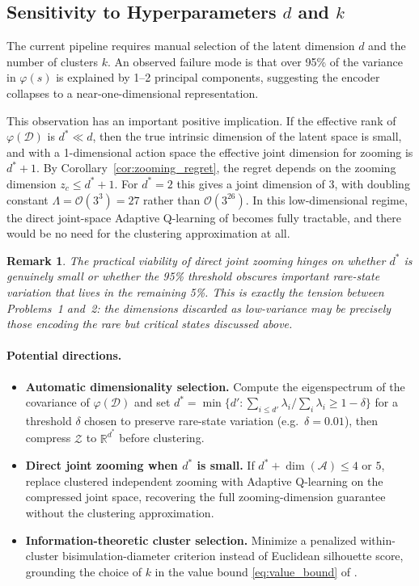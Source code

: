 \documentclass{article}
\newtheorem{remark}[theorem]{Remark}
\begin{document}
\subsection{Sensitivity to Hyperparameters $d$ and $k$}

The current pipeline requires manual selection of the latent dimension $d$ and the
number of clusters $k$. An observed failure mode is that over 95\% of the variance in
$\varphi(s)$ is explained by 1--2 principal components, suggesting the encoder
collapses to a near-one-dimensional representation.

This observation has an important positive implication. If the effective rank of
$\varphi(\mathcal{D})$ is $d^* \ll d$, then the true intrinsic dimension of the
latent space is small, and with a 1-dimensional action space the effective joint
dimension for zooming is $d^* + 1$. By Corollary~\ref{cor:zooming_regret}, the
regret depends on the zooming dimension $z_c \le d^* + 1$. For $d^* = 2$ this gives
a joint dimension of 3, with doubling constant $\Lambda = \mathcal{O}(3^3) = 27$
rather than $\mathcal{O}(3^{26})$. In this low-dimensional regime, the direct
joint-space Adaptive Q-learning of \citet{cao2021} becomes fully tractable, and
there would be no need for the clustering approximation at all.

\begin{remark}
The practical viability of direct joint zooming hinges on whether $d^*$ is genuinely
small or whether the 95\% threshold obscures important rare-state variation that lives
in the remaining 5\%. This is exactly the tension between Problems~1 and~2: the
dimensions discarded as low-variance may be precisely those encoding the rare but
critical states discussed above.
\end{remark}

\paragraph{Potential directions.}
\begin{itemize}[noitemsep]
  \item \textbf{Automatic dimensionality selection.} Compute the eigenspectrum of the
    covariance of $\varphi(\mathcal{D})$ and set
    $d^* = \min\{d' : \sum_{i\le d'}\lambda_i / \sum_i \lambda_i \ge 1-\delta\}$
    for a threshold $\delta$ chosen to preserve rare-state variation (e.g.\
    $\delta = 0.01$), then compress $\mathcal{Z}$ to $\mathbb{R}^{d^*}$ before
    clustering.
  \item \textbf{Direct joint zooming when $d^*$ is small.} If $d^* + \dim(\mathcal{A})
    \le 4$ or $5$, replace clustered independent zooming with Adaptive Q-learning
    \citep{cao2021} on the compressed joint space, recovering the full
    zooming-dimension guarantee without the clustering approximation.
  \item \textbf{Information-theoretic cluster selection.} Minimize a penalized
    within-cluster bisimulation-diameter criterion instead of Euclidean silhouette
    score, grounding the choice of $k$ in the value bound \eqref{eq:value_bound}
    of \citet{zhang2021}.
\end{itemize}
\end{document}
